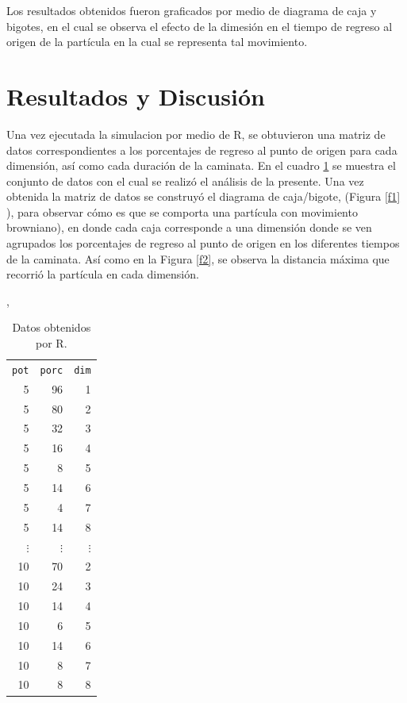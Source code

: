 \documentclass{article}
\begin{document}
Los resultados obtenidos fueron graficados por medio de diagrama de caja y bigotes, en el cual se observa el efecto de la dimesi\'on en el tiempo de regreso al origen de la part\'icula en la cual se representa tal movimiento.

\section{Resultados y Discusi\'on}\label{res}

Una vez ejecutada la simulacion por medio de R, se obtuvieron una matriz de datos correspondientes a los porcentajes de regreso al punto de origen para cada dimensi\'on, as\'i como cada duraci\'on de la caminata. En el cuadro \ref{t1} se muestra el conjunto de datos con el cual se realiz\'o el an\'alisis de la presente.
Una vez obtenida la matriz de datos se construy\'o el diagrama de caja/bigote, (Figura \ref{f1} ), para observar c\'omo es que se comporta una part\'icula con movimiento browniano), en donde cada caja corresponde a una dimensi\'on donde se ven agrupados los porcentajes de regreso al punto de origen en los diferentes tiempos de la caminata.
As\'i como en la Figura \ref{f2}, se observa la distancia m\'axima que recorri\'o la part\'icula en cada dimensi\'on.

\begin{table} 
 \caption{Datos obtenidos por R.}
  \cite{tarea1},
 \label{t1}
 \begin{center}
 \begin{tabular}{rrr}
\texttt{pot} & \texttt{porc} & \texttt{dim} \\
5  &  96  &  1 \\
5  &  80  &  2 \\
5  &  32  &  3 \\
5  &  16  &  4 \\
5  &  8    &   5 \\
5  &  14  &   6 \\
5  &  4    &   7 \\
5  &  14  &   8 \\
$\vdots$ &   $\vdots$ &   $\vdots$ \\
10  &   70  &  2 \\
10  &  24   &  3 \\
10  &  14   &  4 \\
10  &   6    &  5 \\
10  &  14   &  6 \\
10  &  8     &  7 \\
10  &  8     &  8 \\
\end{tabular}
\end{center}
\end{table}
\end{document}
